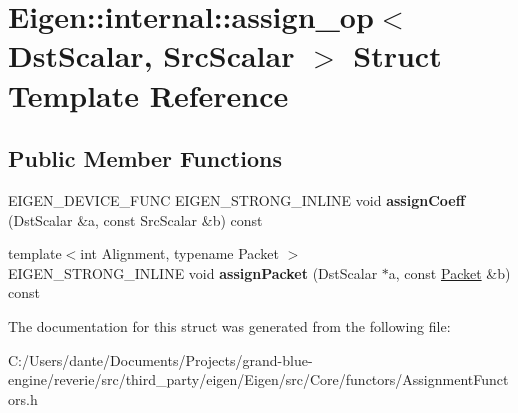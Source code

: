 \hypertarget{struct_eigen_1_1internal_1_1assign__op}{}\section{Eigen\+::internal\+::assign\+\_\+op$<$ Dst\+Scalar, Src\+Scalar $>$ Struct Template Reference}
\label{struct_eigen_1_1internal_1_1assign__op}
\subsection*{Public Member Functions}
\begin{DoxyCompactItemize}
\item 
\mbox{\label{struct_eigen_1_1internal_1_1assign__op_a3ebf383597f27cf667e1819811240a5f}} 
E\+I\+G\+E\+N\+\_\+\+D\+E\+V\+I\+C\+E\+\_\+\+F\+U\+NC E\+I\+G\+E\+N\+\_\+\+S\+T\+R\+O\+N\+G\+\_\+\+I\+N\+L\+I\+NE void {\bfseries assign\+Coeff} (Dst\+Scalar \&a, const Src\+Scalar \&b) const
\item 
\mbox{\label{struct_eigen_1_1internal_1_1assign__op_a692298cacb98ec36a00dadbc36824699}} 
{\footnotesize template$<$int Alignment, typename Packet $>$ }\\E\+I\+G\+E\+N\+\_\+\+S\+T\+R\+O\+N\+G\+\_\+\+I\+N\+L\+I\+NE void {\bfseries assign\+Packet} (Dst\+Scalar $\ast$a, const \mbox{\hyperlink{union_eigen_1_1internal_1_1_packet}{Packet}} \&b) const
\end{DoxyCompactItemize}


The documentation for this struct was generated from the following file\+:\begin{DoxyCompactItemize}
\item 
C\+:/\+Users/dante/\+Documents/\+Projects/grand-\/blue-\/engine/reverie/src/third\+\_\+party/eigen/\+Eigen/src/\+Core/functors/Assignment\+Functors.\+h\end{DoxyCompactItemize}
